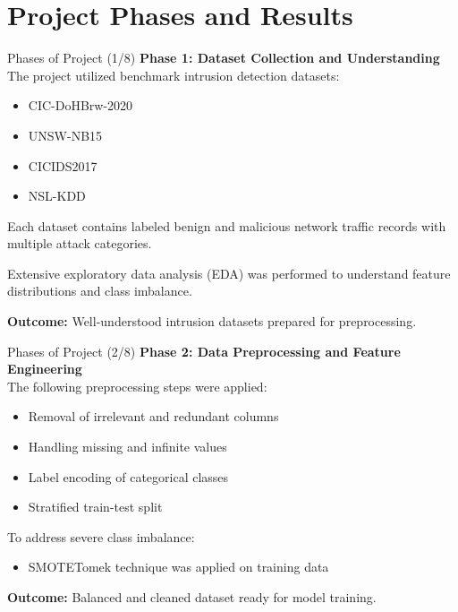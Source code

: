 \documentclass[aspectratio=169,xcolor=dvipsnames]{beamer}
\begin{document}
\section*{Project Phases and Results}


\begin{frame}{Phases of Project (1/8)}
\textbf{Phase 1: Dataset Collection and Understanding} \\[6pt]

The project utilized benchmark intrusion detection datasets:

\begin{itemize}
    \item CIC-DoHBrw-2020
    \item UNSW-NB15
    \item CICIDS2017
    \item NSL-KDD
\end{itemize}

Each dataset contains labeled benign and malicious network traffic records with multiple attack categories.

Extensive exploratory data analysis (EDA) was performed to understand feature distributions and class imbalance.

\vspace{0.2cm}
\textbf{Outcome:}
Well-understood intrusion datasets prepared for preprocessing.
\end{frame}



\begin{frame}{Phases of Project (2/8)}
\textbf{Phase 2: Data Preprocessing and Feature Engineering} \\[6pt]

The following preprocessing steps were applied:

\begin{itemize}
    \item Removal of irrelevant and redundant columns
    \item Handling missing and infinite values
    \item Label encoding of categorical classes
    \item Stratified train-test split
\end{itemize}

To address severe class imbalance:

\begin{itemize}
    \item SMOTETomek technique was applied on training data
\end{itemize}

\vspace{0.2cm}
\textbf{Outcome:}
Balanced and cleaned dataset ready for model training.
\end{frame}
\end{document}
